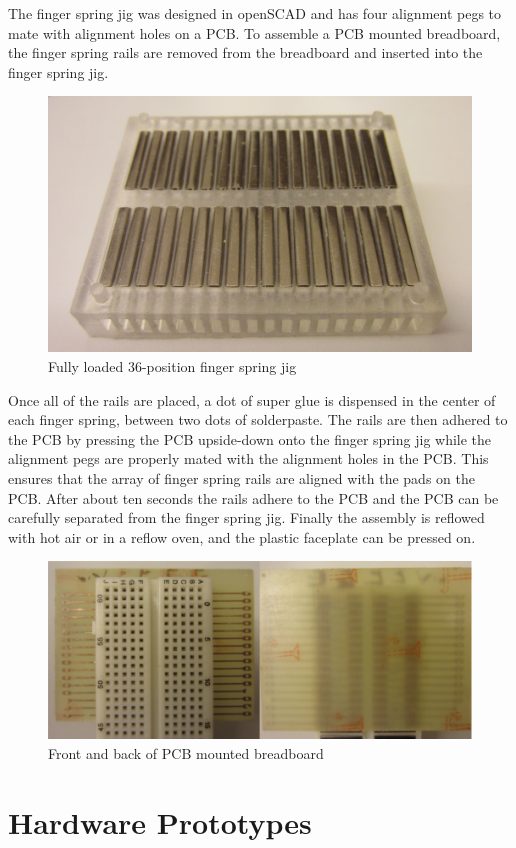 \documentclass[11pt,twoside]{mitthesis}
\begin{document}
The finger spring jig was designed in openSCAD and has four alignment pegs to mate with alignment holes on a PCB.
To assemble a PCB mounted breadboard, the finger spring rails are removed from the breadboard and inserted into the finger spring jig.
\begin{figure}[H]
  \begin{center}
      \includegraphics[width=.6\textwidth]{../bb-w-rails.png}
      \caption{Fully loaded 36-position finger spring jig}
  \end{center}
\end{figure}
Once all of the rails are placed, a dot of super glue is dispensed in the center of each finger spring, between two dots of solderpaste.
The rails are then adhered to the PCB by pressing the PCB upside-down onto the finger spring jig while the alignment pegs are properly mated with the alignment holes in the PCB.
This ensures that the array of finger spring rails are aligned with the pads on the PCB.
After about ten seconds the rails adhere to the PCB and the PCB can be carefully separated from the finger spring jig.
Finally the assembly is reflowed with hot air or in a reflow oven, and the plastic faceplate can be pressed on.
\begin{figure}[H]
  \begin{center}
      \includegraphics[width=.8\textwidth]{../bb-mount.png}
      \caption{Front and back of PCB mounted breadboard}
  \end{center}
\end{figure}

\section{Hardware Prototypes}
\end{document}

